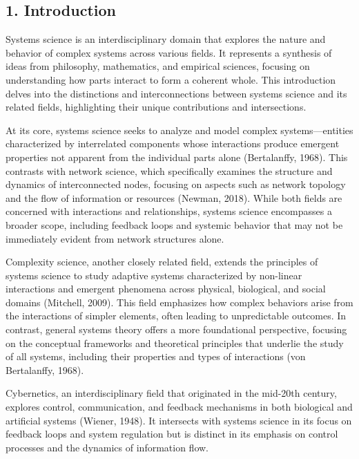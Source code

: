\documentclass[twocolumn]{article}
\begin{document}
\subsection{1. Introduction}

\textcolor{secondary}{Systems science is an interdisciplinary domain that explores the nature and behavior of complex systems across various fields. It represents a synthesis of ideas from philosophy, mathematics, and empirical sciences, focusing on understanding how parts interact to form a coherent whole. This introduction delves into the distinctions and interconnections between systems science and its related fields, highlighting their unique contributions and intersections.}

\textcolor{primary}{At its core, systems science seeks to analyze and model complex systems—entities characterized by interrelated components whose interactions produce emergent properties not apparent from the individual parts alone (Bertalanffy, 1968). This contrasts with network science, which specifically examines the structure and dynamics of interconnected nodes, focusing on aspects such as network topology and the flow of information or resources (Newman, 2018). While both fields are concerned with interactions and relationships, systems science encompasses a broader scope, including feedback loops and systemic behavior that may not be immediately evident from network structures alone.}

\textcolor{secondary}{Complexity science, another closely related field, extends the principles of systems science to study adaptive systems characterized by non-linear interactions and emergent phenomena across physical, biological, and social domains (Mitchell, 2009). This field emphasizes how complex behaviors arise from the interactions of simpler elements, often leading to unpredictable outcomes. In contrast, general systems theory offers a more foundational perspective, focusing on the conceptual frameworks and theoretical principles that underlie the study of all systems, including their properties and types of interactions (von Bertalanffy, 1968).}

\textcolor{primary}{Cybernetics, an interdisciplinary field that originated in the mid-20th century, explores control, communication, and feedback mechanisms in both biological and artificial systems (Wiener, 1948). It intersects with systems science in its focus on feedback loops and system regulation but is distinct in its emphasis on control processes and the dynamics of information flow.}
\end{document}
